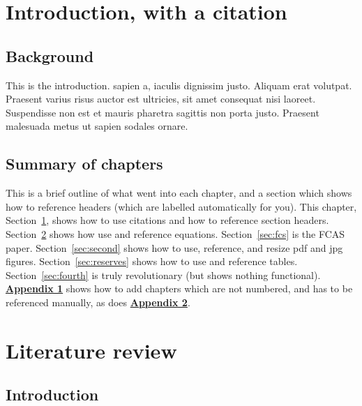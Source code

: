 \documentclass[12pt,a4paper,]{report}
\begin{document}
\newpage

\setcounter{page}{1}
\doublespacing
\setlength{\parindent}{0.5in}

\hypertarget{sec:intro}{%
\chapter{Introduction, with a citation}\label{sec:intro}}

\hypertarget{background}{%
\section{Background}\label{background}}

This is the introduction. sapien a, iaculis dignissim justo. Aliquam
erat volutpat. Praesent varius risus auctor est ultricies, sit amet
consequat nisi laoreet. Suspendisse non est et mauris pharetra sagittis
non porta justo. Praesent malesuada metus ut sapien sodales ornare.

\hypertarget{summary-of-chapters}{%
\section{Summary of chapters}\label{summary-of-chapters}}

This is a brief outline of what went into each chapter, and a section
which shows how to reference headers (which are labelled automatically
for you). This chapter, Section~\ref{sec:intro}, shows how to use
citations and how to reference section headers.
Section~\ref{sec:lit_review} shows how use and reference equations.
Section~\ref{sec:fcs} is the FCAS paper. Section~\ref{sec:second} shows
how to use, reference, and resize pdf and jpg figures.
Section~\ref{sec:reserves} shows how to use and reference tables.
Section~\ref{sec:fourth} is truly revolutionary (but shows nothing
functional).
\textbf{\protect\hyperlink{appendix-1-some-extra-stuff}{Appendix 1}}
shows how to add chapters which are not numbered, and has to be
referenced manually, as does
\textbf{\protect\hyperlink{appendix-2-some-more-extra-stuff}{Appendix
2}}.

\hypertarget{sec:lit_review}{%
\chapter{Literature review}\label{sec:lit_review}}

\hypertarget{introduction}{%
\section{Introduction}\label{introduction}}
\end{document}
